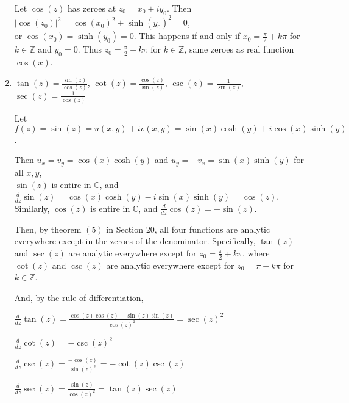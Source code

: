 \documentclass[12pt]{article}
\begin{document}
\begin{enumerate}
    Let $\cos(z)$ has zeroes at $z_0 = x_0 + iy_0$. Then $|\cos(z_0)|^2 = \cos(x_0)^2 + \sinh(y_0)^2 = 0$, \\or $\cos(x_0) = \sinh(y_0) = 0$. This happens if and only if $x_0 = \frac{\pi}{2} + k\pi$ for $k \in \mathbb{Z}$ and $y_0 = 0$. Thus $z_0 = \frac{\pi}{2} + k\pi$ for $k \in \mathbb{Z}$, same zeroes as real function $\cos(x)$.

    \item $\tan(z) = \frac{\sin(z)}{\cos(z)}$, $\cot(z) = \frac{\cos(z)}{\sin(z)}$, $\csc(z) = \frac{1}{\sin(z)}$, $\sec(z) = \frac{1}{\cos(z)}$

    Let $f(z) = \sin(z) =  u(x,y) + iv(x,y) =\sin(x)\cosh(y) + i\cos(x)\sinh(y)$.
    
    Then $u_x = v_y = \cos(x)\cosh(y)$ and $u_y = -v_x = \sin(x)\sinh(y)$ for all $x, y$, \\$\sin(z)$ is entire in $\mathbb{C}$, and $\frac{d}{dz}\sin(z) = \cos(x)\cosh(y) -i \sin(x)\sinh(y) = \cos(z)$. Similarly, $\cos(z)$ is entire in $\mathbb{C}$, and $\frac{d}{dz}\cos(z) = -\sin(z)$. 
    
    Then, by theorem $(5)$ in Section 20, all four functions are analytic everywhere except in the zeroes of the denominator. Specifically, $\tan(z)$ and $\sec(z)$ are analytic everywhere except for $z_0  = \frac{\pi}{2} + k\pi$, where $\cot(z)$ and $\csc(z)$ are analytic everywhere except for $z_0  = \pi + k\pi$ for $k\in\mathbb{Z}$.

    And, by the rule of differentiation, 

    $\frac{d}{dz} \tan(z) = \frac{\cos(z)\cos(z) + \sin(z)\sin(z)}{\cos(z)^2} = \sec(z)^2$

    $\frac{d}{dz} \cot(z) = -\csc(z)^2$

    $\frac{d}{dz} \csc(z) = \frac{-\cos(z)}{\sin(z)^2} = -\cot(z)\csc(z)$

    $\frac{d}{dz} \sec(z) = \frac{\sin(z)}{\cos(z)^2} = \tan(z)\sec(z)$

    
\end{enumerate}
\end{document}
